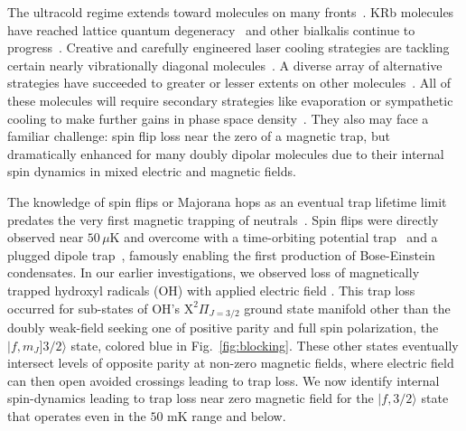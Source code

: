 \documentclass[%
 reprint,
groupedaddress,
 amsmath,amssymb,
 aps,
prl,
]{revtex4-1}
\begin{document}
%
%
The ultracold regime extends toward molecules on many fronts~\cite{Carr2009}. KRb molecules have reached lattice quantum degeneracy~\cite{Moses2015} and other bialkalis continue to progress~\cite{Takekoshi2014, Park2015}. Creative and carefully engineered laser cooling strategies are tackling certain nearly vibrationally diagonal molecules~\cite{Hummon2013, Barry2014, Zhelyazkova2014, Steinecker2016, Hemmerling2016}. A diverse array of alternative strategies have succeeded to greater or lesser extents on other molecules~\cite{Doyle1998, Bethlem1999, Bochinski2003, Narevicius2008, Wiederkehr2012, Prehn2016}. All of these molecules will require secondary strategies like evaporation or sympathetic cooling to make further gains in phase space density~\cite{Parazzoli2011, Stuhl2012evap, Quemener2016}. They also may face a familiar challenge: spin flip loss near the zero of a magnetic trap, but dramatically enhanced for many doubly dipolar molecules due to their internal spin dynamics in mixed electric and magnetic fields. 

The knowledge of spin flips or Majorana hops as an eventual trap lifetime limit predates the very first magnetic trapping of neutrals~\cite{Migdall1985}. Spin flips were directly observed near $50\,\mu\text{K}$ and overcome with a time-orbiting potential trap~\cite{Petrich1995} and a plugged dipole trap~\cite{Davis1995}, famously enabling the first production of Bose-Einstein condensates. In our earlier investigations, we observed loss of magnetically trapped hydroxyl radicals (OH) with applied electric field \cite{Stuhl2012uwave}. This trap loss occurred for sub-states of OH's $\mathrm{X}^2\Pi_{J=3/2}$ ground state manifold other than the doubly weak-field seeking one of positive parity and full spin polarization, the $|f,m_J]3/2\rangle$ state, colored blue in Fig.~\ref{fig:blocking}. These other states eventually intersect levels of opposite parity at non-zero magnetic fields, where electric field can then open avoided crossings leading to trap loss. We now identify internal spin-dynamics leading to trap loss near zero magnetic field for the $|f,3/2\rangle$ state that operates even in the $50\text{ mK}$ range and below. 
\end{document}
